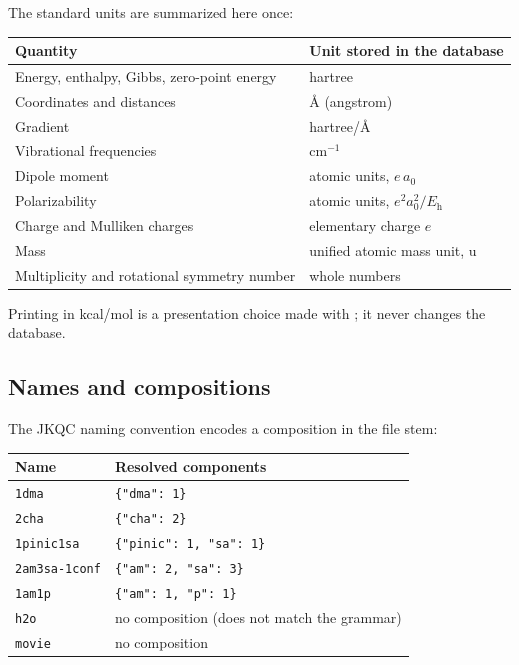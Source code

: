 The standard units are summarized here once:

\begin{center}
\begin{tabular}{@{}ll@{}}
\toprule
Quantity & Unit stored in the database \\
\midrule
Energy, enthalpy, Gibbs, zero-point energy & hartree \\
Coordinates and distances & \AA{} (angstrom) \\
Gradient & hartree/\AA{} \\
Vibrational frequencies & cm$^{-1}$ \\
Dipole moment & atomic units, $e\,a_0$ \\
Polarizability & atomic units, $e^2 a_0^2/E_\mathrm{h}$ \\
Charge and Mulliken charges & elementary charge $e$ \\
Mass & unified atomic mass unit, u \\
Multiplicity and rotational symmetry number & whole numbers \\
\bottomrule
\end{tabular}
\end{center}

Printing in kcal/mol is a presentation choice made with ; it
never changes the database.

\subsection{Names and compositions}\label{sec:names}

The JKQC naming convention encodes a composition in the file stem:

\begin{center}
\begin{tabular}{@{}ll@{}}
\toprule
Name & Resolved components \\
\midrule
\texttt{1dma} & \texttt{\{"dma": 1\}} \\
\texttt{2cha} & \texttt{\{"cha": 2\}} \\
\texttt{1pinic1sa} & \texttt{\{"pinic": 1, "sa": 1\}} \\
\texttt{2am3sa-1conf} & \texttt{\{"am": 2, "sa": 3\}} \\
\texttt{1am1p} & \texttt{\{"am": 1, "p": 1\}} \\
\texttt{h2o} & no composition (does not match the grammar) \\
\texttt{movie} & no composition \\
\bottomrule
\end{tabular}
\end{center}

